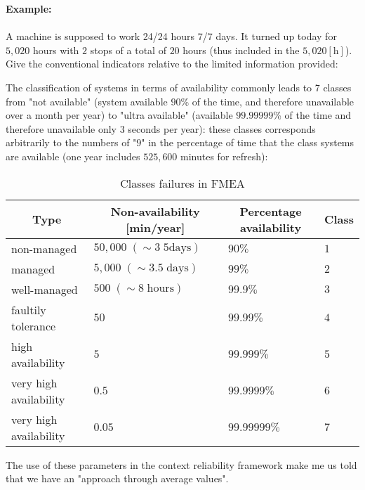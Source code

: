	\begin{tcolorbox}[colframe=black,colback=white,sharp corners]
	\textbf{{\Large {}}Example:}\\\\
	A machine is supposed to work 24/24 hours 7/7 days. It turned up today for $5,020$ hours with $2$ stops of a total of $20$ hours (thus included in the $5,020 [\text{h}]$). Give the conventional indicators relative to the limited information provided:
	

	\end{tcolorbox}
	The classification of systems in terms of availability commonly leads to 7 classes from "not available" (system available $90$\% of the time, and therefore unavailable over a month per year) to "ultra available" (available $99.99999$\% of the time and therefore unavailable only $3$ seconds per year): these classes corresponds arbitrarily to the numbers of "$9$" in the percentage of time that the class systems are available (one year includes $525,600$ minutes for refresh):
	\begin{table}[H]\centering
	\begin{center}
			\begin{tabular}{|p{4cm}|p{3.5cm}|p{2cm}|p{1cm}|}
				\hline
				\multicolumn{1}{c}{\cellcolor{black!30}Type} & 
  \multicolumn{1}{c}{\cellcolor{black!30}Non-availability [min/year]} & 
  \multicolumn{1}{c}{\cellcolor{black!30}Percentage availability} & 
  \multicolumn{1}{c}{\cellcolor{black!30}Class} \\ \hline
				 non-managed & $50,000\; (\sim3\;5 \text{days})$ & $90\%$ & $1$ \\ \hline
				 managed & $5,000\;  (\sim3.5\; \text{days})$ & $99\%$ & $2$ \\ \hline
				 well-managed & $500\; (\sim8\; \text{hours})$ & $99.9\%$ & $3$\\ \hline
				 faultily tolerance & $50$ & $99.99\%$ & $4$ \\ \hline
				 high availability  & $5$ & $99.999\%$ & $5$  \\ \hline
				 very high availability & $0.5$ & $99.9999\%$ & $6$  \\ \hline
				 very high availability & $0.05$ & $99.99999\%$ & $7$  \\ \hline
		\end{tabular}
	\end{center}
	\caption[]{Classes failures in FMEA}
	\end{table}
		The use of these parameters in the context reliability framework make me us told that we have an "approach through average values".
		
